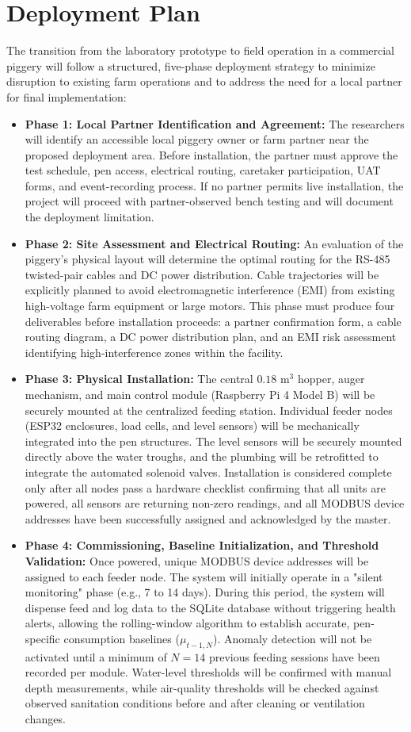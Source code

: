 \section{Deployment Plan}
The transition from the laboratory prototype to field operation in a commercial piggery will follow a structured, five-phase deployment strategy to minimize disruption to existing farm operations and to address the need for a local partner for final implementation:
\begin{itemize}
  \item \textbf{Phase 1: Local Partner Identification and Agreement:} The researchers will identify an accessible local piggery owner or farm partner near the proposed deployment area. Before installation, the partner must approve the test schedule, pen access, electrical routing, caretaker participation, UAT forms, and event-recording process. If no partner permits live installation, the project will proceed with partner-observed bench testing and will document the deployment limitation.
  \item \textbf{Phase 2: Site Assessment and Electrical Routing:} An evaluation of the piggery's physical layout will determine the optimal routing for the RS-485 twisted-pair cables and DC power distribution. Cable trajectories will be explicitly planned to avoid electromagnetic interference (EMI) from existing high-voltage farm equipment or large motors. This phase must produce four deliverables before installation proceeds: a partner confirmation form, a cable routing diagram, a DC power distribution plan, and an EMI risk assessment identifying high-interference zones within the facility.
  \item \textbf{Phase 3: Physical Installation:} The central $0.18\text{ m}^3$ hopper, auger mechanism, and main control module (Raspberry Pi 4 Model B) will be securely mounted at the centralized feeding station. Individual feeder nodes (ESP32 enclosures, load cells, and level sensors) will be mechanically integrated into the pen structures. The level sensors will be securely mounted directly above the water troughs, and the plumbing will be retrofitted to integrate the automated solenoid valves. Installation is considered complete only after all nodes pass a hardware checklist confirming that all units are powered, all sensors are returning non-zero readings, and all MODBUS device addresses have been successfully assigned and acknowledged by the master.
  \item \textbf{Phase 4: Commissioning, Baseline Initialization, and Threshold Validation:} Once powered, unique MODBUS device addresses will be assigned to each feeder node. The system will initially operate in a "silent monitoring" phase (e.g., 7 to 14 days). During this period, the system will dispense feed and log data to the SQLite database without triggering health alerts, allowing the rolling-window algorithm to establish accurate, pen-specific consumption baselines ($\mu_{t-1,N}$). Anomaly detection will not be activated until a minimum of $N = 14$ previous feeding sessions have been recorded per module. Water-level thresholds will be confirmed with manual depth measurements, while air-quality thresholds will be checked against observed sanitation conditions before and after cleaning or ventilation changes.

\end{itemize}
